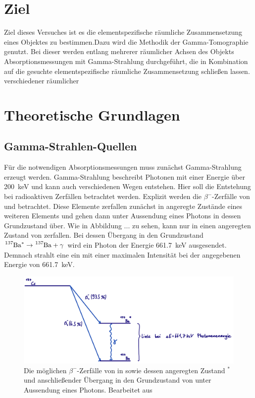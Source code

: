 \section{Ziel}
    Ziel dieses Versuches ist es die elementspezifische räumliche Zusammensetzung eines Objektes zu bestimmen.Dazu wird die Methodik der Gamma-Tomographie genutzt. Bei dieser werden entlang mehrerer räumlicher
    Achsen des Objekts Absorptionsmessungen mit Gamma-Strahlung durchgeführt, die in Kombination auf die gesuchte elementspezifische räumliche Zusammensetzung schließen lassen.   
    verschiedener räumlicher  
\section{Theoretische Grundlagen}
    \subsection{Gamma-Strahlen-Quellen}
        Für die notwendigen Absorptionsmessungen muss zunächst Gamma-Strahlung erzeugt werden. Gamma-Strahlung beschreibt Photonen mit einer Energie über \SI{200}{\kilo\electronvolt} und kann auch verschiedenen
        Wegen entstehen. Hier soll die Entstehung bei radioaktiven Zerfällen betrachtet werden. Explizit werden die $\beta^-$-Zerfälle von  und  betrachtet. Diese Elemente zerfallen 
        zunächst in angeregte Zustände eines weiteren Elements und gehen dann unter Aussendung eines Photons in dessen Grundzustand über. Wie in Abbildung ... zu sehen, kann  nur in einen 
        angeregten Zustand von  zerfallen. Bei dessen Übergang in den Grundzustand $ \ce{^{137}Ba}^* \rightarrow \ce{^{137}Ba} + \gamma$ wird ein Photon der Energie \SI{661.7}{\kilo\electronvolt}
        ausgesendet. Demnach strahlt eine ein  mit einer maximalen Intensität bei der angegebenen Energie von \SI{661.7}{\kilo\electronvolt}.

        \FloatBarrier

        \begin{figure}[h]
          \centering
          \includegraphics[width = 1\textwidth]{pictures/cs.png}
          \caption{Die möglichen $\beta^-$-Zerfälle von  in  sowie dessen angeregten Zustand $^*$ und anschließender Übergang in den Grundzustand von  unter Aussendung eines Photons. Bearbeitet aus }
          \label{fig:cs_schema}
        \end{figure}
    
